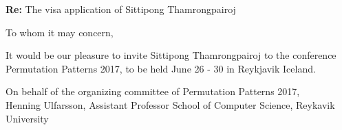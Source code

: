 \documentclass[10pt, a4paper]{letter}
\begin{document}
\address{School of Computer Science \\
         Reykjavik University \\
         Menntavegur 1 \\
         101 Reykjavik, Iceland
}

\signature{}


\begin{letter}{{\bf Re:} The visa application of Sittipong Thamrongpairoj}

\opening{To whom it may concern,}

It would be our pleasure to invite Sittipong Thamrongpairoj to the conference
Permutation Patterns 2017, to be held June 26 - 30 in Reykjavik Iceland.

\closing{On behalf of the organizing committee of Permutation Patterns 2017, \\
Henning Ulfarsson, Assistant Professor
School of Computer Science, Reykavik University}

\end{letter}
\end{document}
